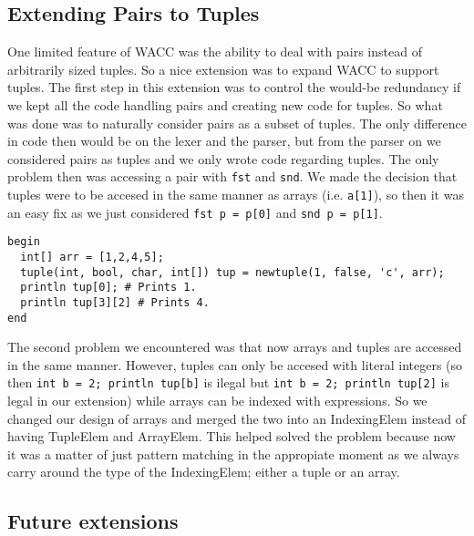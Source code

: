 \documentclass{article}
\begin{document}
\subsection{Extending Pairs to Tuples}
One limited feature of WACC was the ability to deal with pairs instead of arbitrarily sized tuples. So a nice extension was to expand WACC to support tuples. The first step in this extension was to control the would-be redundancy if we kept all the code handling pairs and creating new code for tuples. So what was done was to naturally consider pairs as a subset of tuples. The only difference in code then would be on the lexer and the parser, but from the parser on we considered pairs as tuples and we only wrote code regarding tuples. The only problem then was accessing a pair with \texttt{fst} and \texttt{snd}. We made the decision that tuples were to be accesed in the same manner as arrays (i.e. \texttt{a[1]}), so then it  was an easy fix as we just considered \texttt{fst p = p[0]} and \texttt{snd p = p[1]}.

\begin{lstlisting}
begin
  int[] arr = [1,2,4,5];
  tuple(int, bool, char, int[]) tup = newtuple(1, false, 'c', arr);
  println tup[0]; # Prints 1.
  println tup[3][2] # Prints 4.
end
\end{lstlisting}

The second problem we encountered was that now arrays and tuples are accessed in the same manner. However, tuples can only be accesed with literal integers (so
then \texttt{int b = 2; println tup[b]} is ilegal but \texttt{int b = 2; println tup[2]} is legal in our extension) while arrays can be indexed with expressions. So we changed our design of arrays and merged the two into an IndexingElem instead of having TupleElem and ArrayElem. This helped solved the problem because now it was a matter of just pattern matching in the appropiate moment as we always carry around the type of the IndexingElem; either a tuple or an array.

\subsection{Future extensions}
\end{document}
